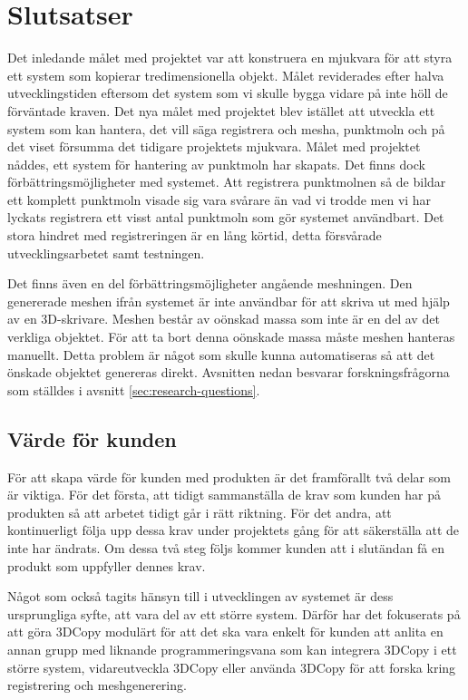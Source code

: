 \chapter{Slutsatser}
\label{cha:conclusion}
Det inledande målet med projektet var att konstruera en mjukvara för att styra ett system som kopierar tredimensionella objekt. Målet reviderades efter halva utvecklingstiden eftersom det system som vi skulle bygga vidare på inte höll de förväntade kraven. Det nya målet med projektet blev istället att utveckla ett system som kan hantera, det vill säga registrera och mesha, punktmoln och på det viset försumma det tidigare projektets mjukvara. Målet med projektet nåddes, ett system för hantering av punktmoln har skapats. Det finns dock förbättringsmöjligheter med systemet. Att registrera punktmolnen så de bildar ett komplett punktmoln visade sig vara svårare än vad vi trodde men vi har lyckats registrera ett visst antal punktmoln som gör systemet användbart. Det stora hindret med registreringen är en lång körtid, detta försvårade utvecklingsarbetet samt testningen.

Det finns även en del förbättringsmöjligheter angående meshningen. Den genererade meshen ifrån systemet är inte användbar för att skriva ut med hjälp av en 3D-skrivare. Meshen består av oönskad massa som inte är en del av det verkliga objektet. För att ta bort denna oönskade massa måste meshen hanteras manuellt. Detta problem är något som skulle kunna automatiseras så att det önskade objektet genereras direkt. Avsnitten nedan besvarar forskningsfrågorna som ställdes i avsnitt \ref{sec:research-questions}.

\section{Värde för kunden}

För att skapa värde för kunden med produkten är det framförallt två delar som är viktiga. För det första, att tidigt sammanställa de krav som kunden har på produkten så att arbetet tidigt går i rätt riktning. För det andra, att kontinuerligt följa upp dessa krav under projektets gång för att säkerställa att de inte har ändrats. Om dessa två steg följs kommer kunden att i slutändan få en produkt som uppfyller dennes krav.

Något som också tagits hänsyn till i utvecklingen av systemet är dess ursprungliga syfte, att vara del av ett större system. Därför har det fokuserats på att göra 3DCopy modulärt för att det ska vara enkelt för kunden att anlita en annan grupp med liknande programmeringsvana som kan integrera 3DCopy i ett större system, vidareutveckla 3DCopy eller använda 3DCopy för att forska kring registrering och meshgenerering.

